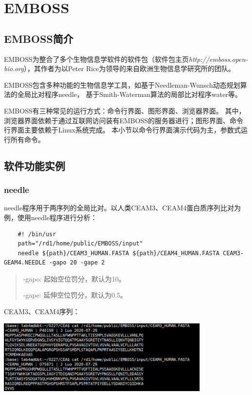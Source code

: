 \chapter{EMBOSS}

\section{EMBOSS简介}

EMBOSS为整合了多个生物信息学软件的软件包（软件包主页\textit{http://emboss.open-bio.org}），其作者为以Peter Rice为领导的来自欧洲生物信息学研究所的团队。

EMBOSS包含多种功能的生物信息学工具，如基于Needleman-Wunsch动态规划算法的全局比对程序needle，
基于Smith-Waterman算法的局部比对程序water等。

EMBOSS有三种常见的运行方式：命令行界面、图形界面、浏览器界面。
其中，浏览器界面依赖于通过互联网访问装有EMBOSS的服务器进行；图形界面、命令行界面主要依赖于Linux系统完成。
本小节以命令行界面演示代码为主，参数式运行所有命令。

\section{软件功能实例}
\subsection{needle}

needle程序用于两序列的全局比对。以人类CEAM3、CEAM4蛋白质序列比对为例，使用needle程序进行分析：

\begin{lstlisting}
    #! /bin/usr
    path="/rd1/home/public/EMBOSS/input"
    needle ${path}/CEAM3_HUMAN.FASTA ${path}/CEAM4_HUMAN.FASTA CEAM3-GEAM4.NEEDLE -gapo 20 -gape 2
\end{lstlisting}

\begin{quotation}
    -gapo: 起始空位罚分，默认为10。

    -gape: 延伸空位罚分，默认为0.5。
\end{quotation}

CEAM3、CEAM4序列：

\includegraphics[width=0.8\textwidth]{./image/gdk/5.2.1.png}

